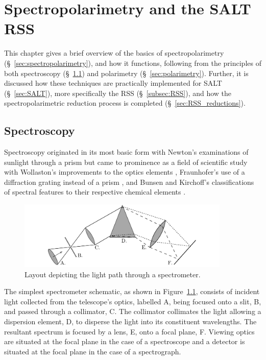 \chapter{Spectropolarimetry and the SALT RSS}

This chapter gives a brief overview of the basics of spectropolarimetry (\S~\ref{sec:spectropolarimetry}), and how it functions, following from the principles of both spectroscopy (\S~\ref{sec:spectroscopy}) and polarimetry (\S~\ref{sec:polarimetry}). Further, it is discussed how these techniques are practically implemented for \gls{SALT} (\S~\ref{sec:SALT}), more specifically the \gls{RSS} (\S~\ref{subsec:RSS}), and how the spectropolarimetric reduction process is completed (\S~\ref{sec:RSS_reductions}).

\section{Spectroscopy}\label{sec:spectroscopy}

Spectroscopy originated in its most basic form with Newton's examinations of sunlight through a prism \citep{opticks} but came to prominence as a field of scientific study with Wollaston's improvements to the optics elements \citep{WollPrism}, Fraunhofer's use of a diffraction grating instead of a prism \citep{FraunGrating}, and Bunsen and Kirchoff's classifications of spectral features to their respective chemical elements \citep{KirBunSpec}.
\prgph

\begin{figure}[t]
    \centering
    \includegraphics[width = 0.9\textwidth]{figures/2_spectrometer.pdf}
    \caption{Layout depicting the light path through a spectrometer.}
    \label{fig:spectrometer}
\end{figure}

The simplest spectrometer schematic, as shown in Figure~\ref{fig:spectrometer}, consists of incident light collected from the telescope's optics, labelled A, being focused onto a slit, B, and passed through a collimator, C. The collimator collimates the light allowing a dispersion element, D, to disperse the light into its constituent wavelengths. The resultant spectrum is focused by a lens, E, onto a focal plane, F. Viewing optics are situated at the focal plane in the case of a spectroscope and a detector is situated at the focal plane in the case of a spectrograph.

